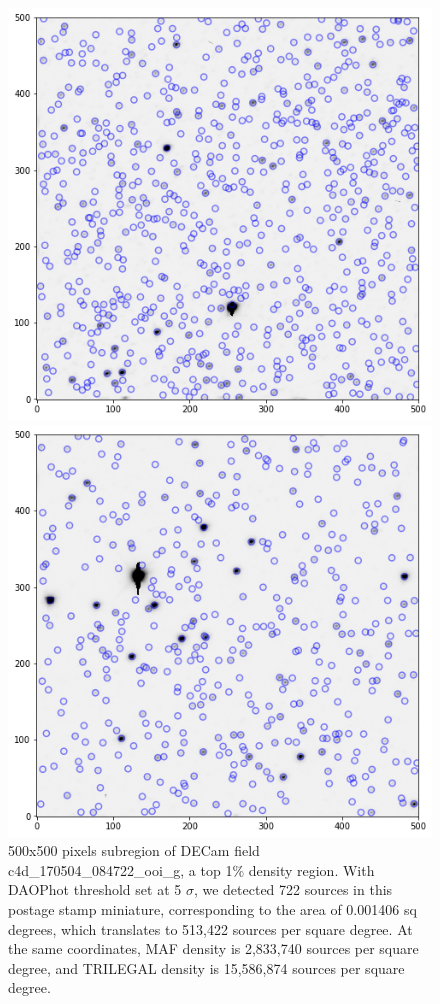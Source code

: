 \documentclass[DM,lsstdraft,toc,usenatbib]{lsstdoc}
\begin{document}
\begin{figure}
\begin{minipage}[t]{0.5\linewidth}
\includegraphics[width=\linewidth]{figs/c4d_170504_084722_ooi_g_v1_1_sub_500px.png}
\caption{500x500 pixels subregion of DECam field c4d\_170504\_084722\_ooi\_g,
a top 1\% density region. With DAOPhot threshold set at 5 $\sigma$,  we detected 722 sources in this postage stamp miniature, corresponding to the area of 0.001406 sq degrees, which translates to 513,422 sources per square degree. At the same coordinates, MAF density is 2,833,740 sources per square degree, and TRILEGAL density is 15,586,874 sources per square degree. }
\label{fig:decam_1_perc_miniature}
\end{minipage}
\hfill
\begin{minipage}[t]{0.5\linewidth}
\includegraphics[width=\linewidth]{figs/c4d_170429_035748_ooi_g_v1_1_sub_500px.png}

\end{minipage}
\end{figure}
\end{document}
